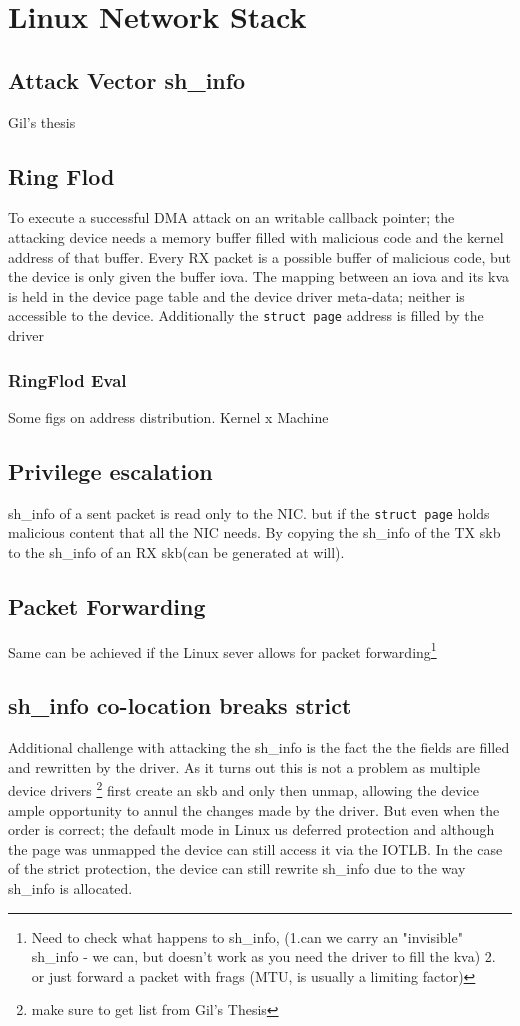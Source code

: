 \section{Linux Network Stack}

\subsection{Attack Vector sh\_info}
Gil's thesis
\subsection{Ring Flod}
To execute a successful DMA attack on an writable callback pointer; the attacking device needs a memory buffer filled with malicious code and the kernel address of that buffer.
Every RX packet is a possible buffer of malicious code, but the device is only given the buffer iova. The mapping between an iova and its kva is held in the device page table and the device driver meta-data; neither is accessible to the device. Additionally the \texttt{struct page} address is filled by the driver 
\subsubsection{RingFlod Eval}
Some figs on address distribution.
Kernel x Machine
\subsection{Privilege escalation}
sh\_info of a sent packet is read only to the NIC.
but if the \texttt{struct page} holds malicious content that all the NIC needs. By copying the sh\_info of the TX skb to the sh\_info of an RX skb(can be generated at will). 

\subsection{Packet Forwarding}
Same can be achieved if the Linux sever allows for packet forwarding\footnote{Need to check what happens to sh\_info, (1.can we carry an "invisible" sh\_info - we can, but doesn't work as you need the driver to fill the kva) 2. or just forward a packet with frags (MTU, is usually a limiting factor)}

\subsection{sh\_info co-location breaks strict}
Additional challenge with attacking the sh\_info is the fact the the fields are filled and rewritten by the driver. As it turns out this is not a problem as multiple device drivers \footnote{make sure to get list from Gil's Thesis} first create an skb and only then unmap, allowing the device ample opportunity to annul the changes made by the driver. But even when the order is correct; the default mode in Linux us deferred protection and although the page was unmapped the device can still access it via the IOTLB. In the case of the strict protection, the device can still rewrite sh\_info due to the way sh\_info is allocated. 
